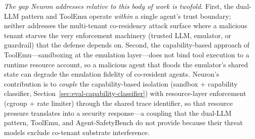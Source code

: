 \emph{The gap Neuron addresses relative to this body of work is
twofold.} First, the dual-LLM pattern and ToolEmu operate
\emph{within} a single agent's trust boundary; neither addresses the
multi-tenant co-residency attack surface where a malicious tenant
starves the very enforcement machinery (trusted LLM, emulator, or
guardrail) that the defense depends on. Second, the capability-based
approach of ToolEmu---sandboxing at the emulation layer---does not
bind tool execution to a runtime resource account, so a malicious
agent that floods the emulator's shared state can degrade the
emulation fidelity of co-resident agents. Neuron's contribution is to
\emph{couple} the capability-based isolation (sandbox + capability
classifier, Section~\ref{sec:eval-capability-classifier}) with
resource-layer enforcement (cgroup + rate limiter) through the shared
trace identifier, so that resource pressure translates into a security
response---a coupling that the dual-LLM pattern, ToolEmu, and
Agent-SafetyBench do not provide because their threat models exclude
co-tenant substrate interference.

